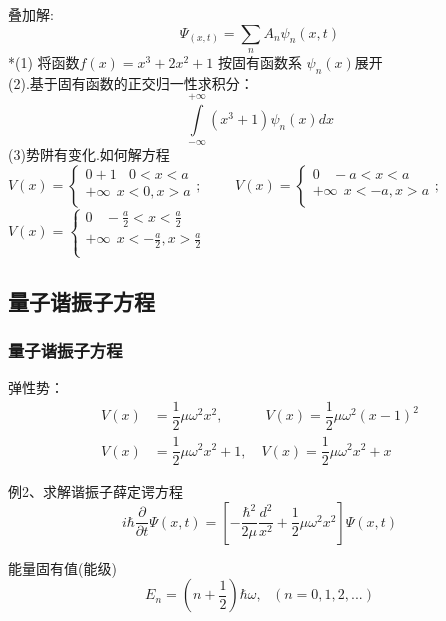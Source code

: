 \begin{frame}
      \frametitle{}
    叠加解:
		\[\Psi_(x,t)= \sum_n A_n \psi_n(x,t)\]
    *(1) 将函数$f(x)=x^3+2x^2 +1$ 按固有函数系 $\psi_n(x)$展开 \\
    (2).基于固有函数的正交归一性求积分：
  \[ \int\limits_{-\infty}^{+\infty} (x^3 +1)\psi_n(x) d x \]
    (3)势阱有变化.如何解方程\\ \vspace*{0.6em}
       {$ \displaystyle 
     V(x)=\left \{ 
     \begin{array}{cccc}
         0+1	~~ ~~ 0<x<a \\  
         +\infty ~~x<0, x>a\\
     \end{array}
     \right.
     ;\qquad $} 
     {$ \displaystyle  V(x)=\left \{ 
        \begin{array}{cccc}
            0	~~ ~~ -a<x<a \\  
            +\infty ~~x<-a, x>a\\
        \end{array}
        \right.
    ;$}\\ \vspace*{0.3em}
    {$ \displaystyle   V(x)=\left \{ 
        \begin{array}{cccc}
            0	~~ ~~ -\frac{a}{2}<x<\frac{a}{2} \\  
            +\infty ~~x<-\frac{a}{2}, x>\frac{a}{2}\\
        \end{array}
        \right.
     $} \\
\end{frame}

\subsection{量子谐振子方程}

\begin{frame}
	\frametitle{量子谐振子方程}
    弹性势：
    \[ \begin{aligned}
        V(x)&=\dfrac{1}{2} \mu \omega ^2 x^2, \quad \qquad V(x)=\dfrac{1}{2} \mu \omega ^2 (x-1)^2\\ 
        V(x)&=\dfrac{1}{2} \mu \omega ^2 x^2 +1,  \quad V(x)=\dfrac{1}{2} \mu \omega ^2 x^2 +x        
    \end{aligned}\]
	\begin{exampleblock} {例2、求解谐振子薛定谔方程}
	\begin{equation*}
		i\hbar \frac{\partial }{\partial t} \Psi (x,t ) =[ -\frac{\hbar^2}{2\mu } \frac{d ^2}{x^2} + \frac{1}{2} \mu \omega ^2 x^2   ] \Psi (x, t ) 
	\end{equation*}
	\end{exampleblock}
	能量固有值(能级)
	\begin{equation*}
		E_n=\left(n+\frac{1}{2}\right) \hbar \omega, ~~~  ( n=0,1,2, ...)  
	\end{equation*}  
\end{frame}

